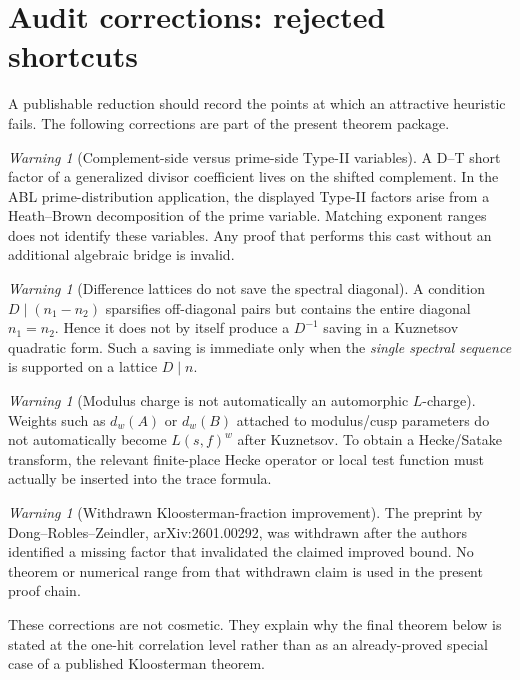 \documentclass[11pt]{article}
\theoremstyle{definition}
\theoremstyle{remark}
\newtheorem{warning}[theorem]{Warning}
\newcommand{\1}{\mathbf 1}
\begin{document}
\section{Audit corrections: rejected shortcuts}\label{sec:audit}

A publishable reduction should record the points at which an attractive heuristic fails.  The following corrections are part of the present theorem package.

\begin{warning}[Complement-side versus prime-side Type-II variables]\label{warn:type}
A D--T short factor of a generalized divisor coefficient lives on the shifted complement.  In the ABL prime-distribution application, the displayed Type-II factors arise from a Heath--Brown decomposition of the prime variable.  Matching exponent ranges does not identify these variables.  Any proof that performs this cast without an additional algebraic bridge is invalid.
\end{warning}

\begin{warning}[Difference lattices do not save the spectral diagonal]\label{warn:diagonal}
A condition $D\mid(n_1-n_2)$ sparsifies off-diagonal pairs but contains the entire diagonal $n_1=n_2$.  Hence it does not by itself produce a $D^{-1}$ saving in a Kuznetsov quadratic form.  Such a saving is immediate only when the \emph{single spectral sequence} is supported on a lattice $D\mid n$.
\end{warning}

\begin{warning}[Modulus charge is not automatically an automorphic $L$-charge]\label{warn:Lcharge}
Weights such as $d_w(A)$ or $d_w(B)$ attached to modulus/cusp parameters do not automatically become $L(s,f)^w$ after Kuznetsov.  To obtain a Hecke/Satake transform, the relevant finite-place Hecke operator or local test function must actually be inserted into the trace formula.
\end{warning}

\begin{warning}[Withdrawn Kloosterman-fraction improvement]\label{warn:withdrawn}
The preprint by Dong--Robles--Zeindler, arXiv:2601.00292, was withdrawn after the authors identified a missing factor that invalidated the claimed improved bound.  No theorem or numerical range from that withdrawn claim is used in the present proof chain.
\end{warning}

These corrections are not cosmetic.  They explain why the final theorem below is stated at the one-hit correlation level rather than as an already-proved special case of a published Kloosterman theorem.
\end{document}
